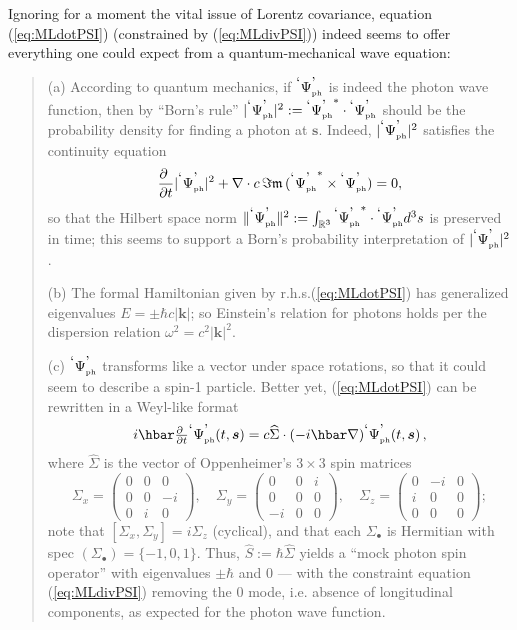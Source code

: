 \documentclass[12pt]{article}
\theoremstyle{definition}
\newcommand{\pddt}{\frac{\partial\phantom{t}}{\partial t}}
\newcommand{\refeq}[1]{(\ref{#1})}
\newcommand{\vect}[1] {\boldsymbol{{ #1}} }
\newcommand{\kV}{{\vect{k}}}		%
\newcommand{\sV}{{\vect{s}}}            %
\numberwithin{equation}{section}
\newcommand{\fm}{\mathfrak{m}}
\newcommand{\PsiPh}{{}^{\mbox{\textrm{`}}}{\Psi_{\mbox{\rm\tiny ph}}^{\mbox{\textrm{'}}}}}
\newcommand{\Rset}{{\mathbb R}}
\newcommand{\Si}{\Sigma}
\newcommand{\nab}{\nabla}
\begin{document}
 Ignoring for a moment the vital issue of Lorentz covariance, equation \refeq{eq:MLdotPSI} (constrained by \refeq{eq:MLdivPSI}) indeed
seems to offer everything one could expect from a quantum-mechanical wave equation:
\begin{quotation}
\noindent
 (a)  According to quantum mechanics, if $\PsiPh$ is indeed the photon wave function, then by ``Born's rule'' 
$|\PsiPh|^2  := \PsiPh^*\cdot\PsiPh$ should be the probability density for finding a photon at $\sV$. 
 Indeed, $|\PsiPh|^2$ satisfies the continuity equation
\begin{equation}
\pddt |\PsiPh|^2 + \nabla\cdot c\,\Im\fm\, (\PsiPh^*\times\PsiPh) = 0,
\end{equation}
so that the Hilbert space norm $\|\PsiPh\|^2:= \int_{\Rset^3}\PsiPh^*\cdot\PsiPh d^3s$ is preserved in time; this seems to support
a Born's probability interpretation of $|\PsiPh|^2$.
\smallskip

\noindent
 (b) The formal Hamiltonian given by r.h.s.\refeq{eq:MLdotPSI} has generalized eigenvalues $E = \pm \hbar c|\kV|$; so Einstein's 
relation for photons holds per the dispersion relation $\omega^2 = c^2|\kV|^2$.
\smallskip

\noindent
 (c) $\PsiPh$ transforms like a vector under space rotations, so that it could seem to describe a spin-1 particle.
    Better yet, \refeq{eq:MLdotPSI} can be rewritten in a Weyl-like format 
\begin{equation}
 i \hbar \textstyle{\pddt}{\PsiPh}(t,\sV)
= \label{eq:MLdotPSIinWEYLshape}
         c \widehat{\Sigma}\cdot (-i\hbar\nab){\PsiPh}(t,\sV) \, ,
\end{equation}
where $\widehat{\Si}$ is the vector of Oppenheimer's $3\times3$ spin matrices 
\begin{equation}
\Sigma_x = 
\begin{pmatrix}  0 &  0 & 0 \\ 
                 0 &  0 & -i\\ 
                 0 &  i & 0 
\end{pmatrix},\quad 
\Sigma_y = 
\begin{pmatrix}  0 &  0 & i\\ 
                 0 &  0 & 0 \\ 
                -i &  0 & 0 
\end{pmatrix},\quad
\Sigma_z = 
\begin{pmatrix} 0 & -i & 0 \\ 
                i &  0 & 0 \\ 
                0 &  0 & 0 
\end{pmatrix};
\end{equation}
note that $[\Sigma_x,\Sigma_y]=i\Sigma_z$ (cyclical), and that each $\Sigma_\bullet^{}$ is Hermitian with spec $(\Sigma_\bullet^{})=\{-1,0,1\}$. 
 Thus, $\widehat{S}:=\hbar\widehat{\Sigma}$ yields a ``mock photon spin operator'' with eigenvalues $\pm\hbar$ and $0$ --- with 
the constraint equation \refeq{eq:MLdivPSI} removing the $0$ mode, i.e. absence of longitudinal components, as expected for the photon 
wave function.
\end{quotation}
\end{document}
